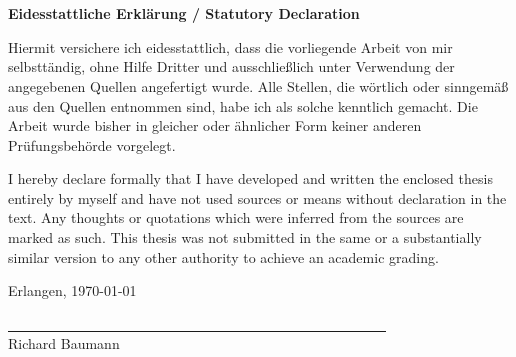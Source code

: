 %
% 


\chapter*{\ }


\vspace*{\fill}


\begin{Large}
	\textbf{Eidesstattliche Erklärung / Statutory Declaration}
\end{Large}
\vspace{1.5em}


Hiermit versichere ich eidesstattlich, dass die vorliegende Arbeit von mir selbsttändig, ohne Hilfe Dritter und ausschließlich unter Verwendung der angegebenen Quellen angefertigt wurde. Alle Stellen, die wörtlich oder sinngemäß aus den Quellen entnommen sind, habe ich als solche kenntlich gemacht. Die Arbeit wurde bisher in gleicher oder ähnlicher Form keiner anderen Prüfungsbehörde vorgelegt. 
\vspace{1.5em}




I hereby declare formally that I have developed and written the enclosed thesis entirely by myself and have not used sources or means without declaration in the text. Any thoughts or quotations which were inferred from the sources are marked as such. This thesis was not submitted in the same or a substantially similar version to any other authority to achieve an academic grading. 
\vspace{2em}


Erlangen, \today\\
\begin{flushright}
	\underline{\ \ \ \ \ \ \ \ \ \ \ \ \ \ \ \ \ \ \ \ \ \ \ \ \ 
		\ \ \ \ \ \ \ \ \ \ \ \ \ \ \ \ \ \ \ \ \ \ \ \ \ \ \ \ \ 
	}\\
	\small{Richard Baumann}
\end{flushright}

